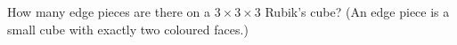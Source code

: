 How many edge pieces are there on a $3\times3\times3$ Rubik's cube? (An edge piece is a small cube with exactly two coloured faces.)
